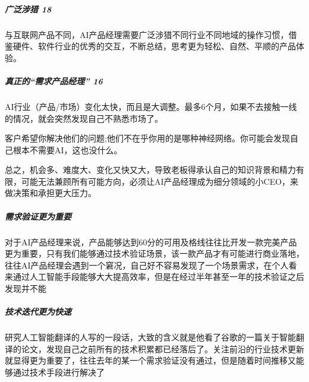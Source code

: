 \documentclass[letterpaper,11pt,english]{sphinxmanual}
\begin{document}
\subparagraph{广泛涉猎 18\sphinxfootnotemark[80]}
\label{\detokenize{chapter_introduction/AI_PM:id4}}%
\begin{footnotetext}[80]\sphinxAtStartFootnote
{}
%
\end{footnotetext}\ignorespaces 
与互联网产品不同，AI产品经理需要广泛涉猎不同行业不同地域的操作习惯，借鉴硬件、软件行业的优秀的交互，不断总结，思考更为轻松、自然、平顺的产品体验。


\subparagraph{真正的“需求产品经理” 16\sphinxfootnotemark[81]}
\label{\detokenize{chapter_introduction/AI_PM:id5}}%
\begin{footnotetext}[81]\sphinxAtStartFootnote
{}
%
\end{footnotetext}\ignorespaces 
AI行业（产品/市场）变化太快，而且是大调整。最多6个月，如果不去接触一线的情况，就会突然发现自己不熟悉市场了。

客户希望你解决他们的问题;他们不在乎你用的是哪种神经网络。你可能会发现自己根本不需要AI，这也没什么。

总之，机会多、难度大、变化又快又大，导致老板得承认自己的知识背景和精力有限，可能无法兼顾所有可能方向，必须让AI产品经理成为细分领域的小CEO，来做决策和承担更大压力。


\subparagraph{需求验证更为重要}
\label{\detokenize{chapter_introduction/AI_PM:id6}}
对于AI产品经理来说，产品能够达到60分的可用及格线往往比开发一款完美产品更为重要，只有我们能够通过技术验证场景，该一款产品才有可能进行商业落地，往往AI产品经理会遇到一个窘况，自己好不容易发现了一个场景需求，在个人看来通过人工智能手段能够大大提高效率，但是在经过半年甚至一年的技术验证之后发现并不能


\subparagraph{技术迭代更为快速}
\label{\detokenize{chapter_introduction/AI_PM:id7}}
研究人工智能翻译的人写的一段话，大致的含义就是他看了谷歌的一篇关于智能翻译的论文，发现自己之前所有的技术积累都已经落后了。关注前沿的行业技术更新就显得更为重要了，往往去年的某一个需求验证没有通过，但是随着时间推移又能够通过技术手段进行解决了
\end{document}
